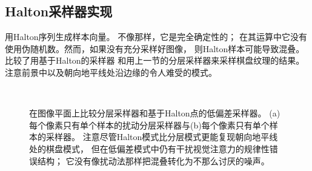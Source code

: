 \subsection{Halton采样器实现}\label{sub:Halton采样器实现}
用Halton序列生成样本向量。
不像那样，它是完全确定性的；
在其运算中它没有使用伪随机数。然而，如果没有充分采样好图像，
则Halton样本可能导致混叠。比较了用基于Halton的采样器
和用上一节的分层采样器来采样棋盘纹理的结果。
注意前景中以及朝向地平线处沿边缘的令人难受的模式。
\begin{figure}[htbp]
    \centering
    \\
    \caption{在图像平面上比较分层采样器和基于Halton点的低偏差采样器。
        (a)每个像素只有单个样本的扰动分层采样器与(b)每个像素只有单个样本的采样器。
        注意尽管Halton模式比分层模式更能复现朝向地平线处的棋盘模式，
        但在低偏差模式中仍有干扰视觉注意力的规律性错误结构；
        它没有像扰动法那样把混叠转化为不那么讨厌的噪声。}
    \label{fig:7.27}
\end{figure}

